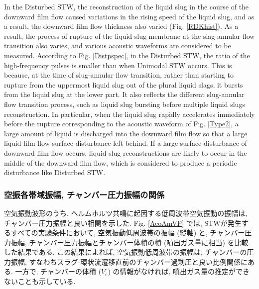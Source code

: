 \documentclass[12pt]{article}
\begin{document}
In the Disturbed STW, the reconstruction of the liquid slug in the course of the downward film flow caused variations in the rising speed of the liquid slug, and as a result, the downward film flow thickness also varied (Fig. \ref{RDKhist}).
As a result, the process of rupture of the liquid slug membrane at the slag-annular flow transition also varies, and various acoustic waveforms are considered to be measured.
According to Fig. \ref{Distpspec}, in the Disturbed STW, the ratio of the high-frequency pulses is smaller than when Unimodal STW occurs.
This is because, at the time of slug-annular flow transition, rather than starting to rupture from the uppermost liquid slug out of the plural liquid slags, it bursts from the liquid slug at the lower part.
It also reflects the different slug-annular flow transition process, such as liquid slug bursting before multiple liquid slugs reconstruction.
In particular, when the liquid slug rapidly accelerates immediately before the rupture corresponding to the acoustic waveform of Fig. \ref{Type2}, a large amount of liquid is discharged into the downward film flow so that a large liquid film flow surface disturbance left behind.
If a large surface disturbance of downward film flow occurs, liquid slug reconstructions are likely to occur in the middle of the downward film flow, which is considered to produce a periodic disturbance like Disturbed STW.






\subsubsection{空振各帯域振幅, チャンバー圧力振幅の関係}


空気振動波形のうち, ヘルムホルツ共鳴に起因する低周波帯空気振動の振幅は, チャンバー圧力振幅と良い相関を示した. 
Fig. \ref{AcoAmVP} では, STWが発生するすべての実験条件において, 空気振動低周波帯の振幅 (縦軸) と, チャンバー圧力振幅, チャンバー圧力振幅とチャンバー体積の積 (噴出ガス量に相当) を比較した結果である. 
この結果によれば, 空気振動低周波帯の振幅は, チャンバーの圧力振幅, すなわちスラグ-環状流遷移直前のチャンバー過剰圧と良い比例関係にある. 
一方で, チャンバーの体積 ($V_\mathrm{c}$) の情報がなければ, 噴出ガス量の推定ができないことも示している. 
\end{document}
